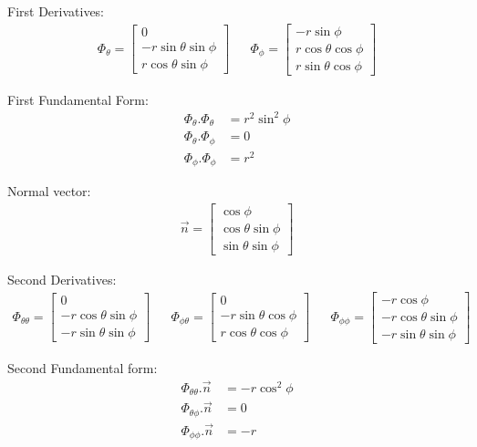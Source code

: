   First Derivatives:
  \begin{align}
    \Phi_{\theta} =
    \begin{bmatrix}
      0 \\
      -r \sin \theta \sin \phi \\
      r \cos \theta \sin \phi
    \end{bmatrix}
    &&
    \Phi_{\phi} =
    \begin{bmatrix}
      -r \sin \phi \\
      r \cos \theta \cos \phi \\
      r \sin \theta \cos \phi
    \end{bmatrix}
  \end{align}

  First Fundamental Form:
  \begin{align}
    \Phi_{\theta}.\Phi_{\theta} &= r^2 \sin^2 \phi \\
    \Phi_{\theta}.\Phi_{\phi} &= 0 \\
    \Phi_{\phi}.\Phi_{\phi} &= r^2
  \end{align}

  Normal vector:
  \begin{align}
    \vec n = \begin{bmatrix} \cos \phi\\
    \cos \theta \sin \phi\\
    \sin \theta \sin \phi \end{bmatrix}
  \end{align}

  Second Derivatives:
  \begin{align}
    \Phi_{\theta \theta} =
    \begin{bmatrix}
      0 \\
      -r \cos \theta \sin \phi \\
      -r \sin \theta \sin \phi
    \end{bmatrix}
    &&
    \Phi_{\phi \theta} =
    \begin{bmatrix}
      0 \\
      -r \sin \theta \cos \phi \\
      r \cos \theta \cos \phi
    \end{bmatrix}
    &&
    \Phi_{\phi \phi} =
    \begin{bmatrix}
      -r \cos \phi \\
      -r \cos \theta \sin \phi \\
      -r \sin \theta \sin \phi
    \end{bmatrix}
  \end{align}

  Second Fundamental form:
  \begin{align}
    \Phi_{\theta \theta}.\vec n &= -r \cos^2 \phi \\
    \Phi_{\theta \phi}.\vec n &= 0 \\
    \Phi_{\phi \phi}.\vec n &= -r
  \end{align}
\fi
